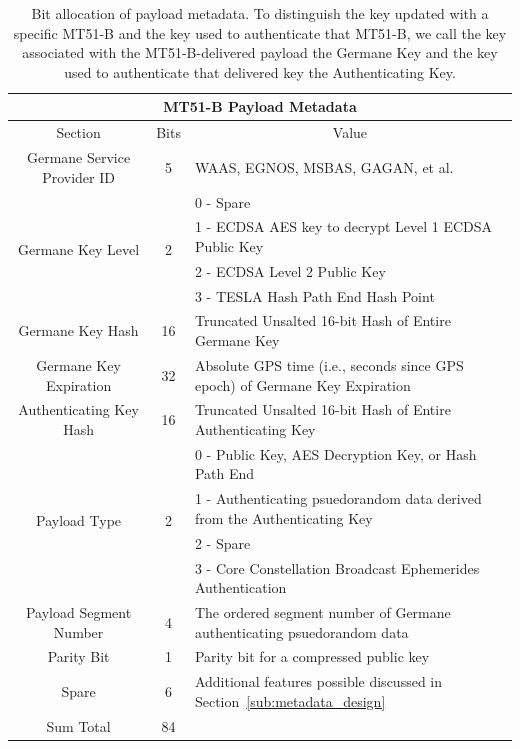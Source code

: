 \documentclass[letterpaper,times]{IONconf/IONconf}
\begin{document}
		\begin{table}%
			\center
			\begin{tabular}{|c|c|l|} \hline
				\multicolumn{3}{|c|}{MT51-B Payload Metadata} \\ \hline
				Section & Bits & \multicolumn{1}{|c|}{Value} \\ \hline
				Germane Service Provider ID & 5 & WAAS, EGNOS, MSBAS, GAGAN, et al. \\ \hline
				\multirow{4}{*}{Germane Key Level} & \multirow{4}{*}{2} & 0 - Spare \\ 
				& & 1 - ECDSA AES key to decrypt Level 1 ECDSA Public Key \\
				& & 2 - ECDSA Level 2 Public Key \\
				& & 3 - TESLA Hash Path End Hash Point \\ \hline
				Germane Key Hash & 16 & Truncated Unsalted 16-bit Hash of Entire Germane Key \\ \hline
				Germane Key Expiration & 32 & Absolute GPS time (i.e., seconds since GPS epoch) of Germane Key Expiration \\ \hline
				Authenticating Key Hash & 16 & Truncated Unsalted 16-bit Hash of Entire Authenticating Key \\ \hline
				\multirow{4}{*}{Payload Type} & \multirow{4}{*}{2} & 0 - Public Key, AES Decryption Key, or Hash Path End \\
				& & 1 - Authenticating psuedorandom data derived from the Authenticating Key \\ 
				& & 2 - Spare \\ 
				& & 3 - Core Constellation Broadcast Ephemerides Authentication \\ \hline
				Payload Segment Number & 4 & The ordered segment number of Germane authenticating psuedorandom data \\ \hline
				Parity Bit & 1 & Parity bit for a compressed public key \\ \hline
				Spare & 6 & Additional features possible discussed in Section~\ref{sub:metadata_design} \\ \hline
				Sum Total & 84 & \\ \hline
			\end{tabular}
			\caption{Bit allocation of payload metadata. To distinguish the key updated with a specific MT51-B and the key used to authenticate that MT51-B, we call the key associated with the MT51-B-delivered payload the Germane Key and the key used to authenticate that delivered key the Authenticating Key.}
			\label{tab: meta-data}
		\end{table}
\end{document}
